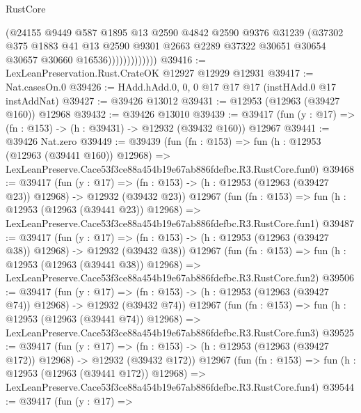\begin{lexlean}{RustCore}
\begin{coremodule}
                          (@24155
                            @9449
                            @587
                            @1895
                            @13
                            @2590
                            @4842
                            @2590
                            @9376
                            @31239
                            (@37302
                              @375
                              @1883
                              @41
                              @13
                              @2590
                              @9301
                              @2663
                              @2289
                              @37322
                              @30651
                              @30654
                              @30657
                              @30660
                              @16536)))))))))))))
@39416 := LexLeanPreservation.Rust.CrateOK @12927 @12929 @12931
@39417 := Nat.casesOn.{0}
@39426 := HAdd.hAdd.{0, 0, 0} @17 @17 @17 (instHAdd.{0} @17 instAddNat)
@39427 := @39426 @13012
@39431 := @12953 (@12963 (@39427 @160)) @12968
@39432 := @39426 @13010
@39439 := @39417 (fun (y : @17) => (fn : @153) -> (h : @39431) -> @12932 (@39432 @160)) @12967
@39441 := @39426 Nat.zero
@39449 := @39439
    (fun (fn : @153) =>
    fun (h : @12953 (@12963 (@39441 @160)) @12968) =>
    LexLeanPreserve.Cace53f3ce88a454b19e67ab886fdefbc.R3.RustCore.fun0)
@39468 := @39417
    (fun (y : @17) =>
    (fn : @153) -> (h : @12953 (@12963 (@39427 @23)) @12968) -> @12932 (@39432 @23))
    @12967
    (fun (fn : @153) =>
    fun (h : @12953 (@12963 (@39441 @23)) @12968) =>
    LexLeanPreserve.Cace53f3ce88a454b19e67ab886fdefbc.R3.RustCore.fun1)
@39487 := @39417
    (fun (y : @17) =>
    (fn : @153) -> (h : @12953 (@12963 (@39427 @38)) @12968) -> @12932 (@39432 @38))
    @12967
    (fun (fn : @153) =>
    fun (h : @12953 (@12963 (@39441 @38)) @12968) =>
    LexLeanPreserve.Cace53f3ce88a454b19e67ab886fdefbc.R3.RustCore.fun2)
@39506 := @39417
    (fun (y : @17) =>
    (fn : @153) -> (h : @12953 (@12963 (@39427 @74)) @12968) -> @12932 (@39432 @74))
    @12967
    (fun (fn : @153) =>
    fun (h : @12953 (@12963 (@39441 @74)) @12968) =>
    LexLeanPreserve.Cace53f3ce88a454b19e67ab886fdefbc.R3.RustCore.fun3)
@39525 := @39417
    (fun (y : @17) =>
    (fn : @153) -> (h : @12953 (@12963 (@39427 @172)) @12968) -> @12932 (@39432 @172))
    @12967
    (fun (fn : @153) =>
    fun (h : @12953 (@12963 (@39441 @172)) @12968) =>
    LexLeanPreserve.Cace53f3ce88a454b19e67ab886fdefbc.R3.RustCore.fun4)
@39544 := @39417
    (fun (y : @17) =>

\end{coremodule}
\end{lexlean}
